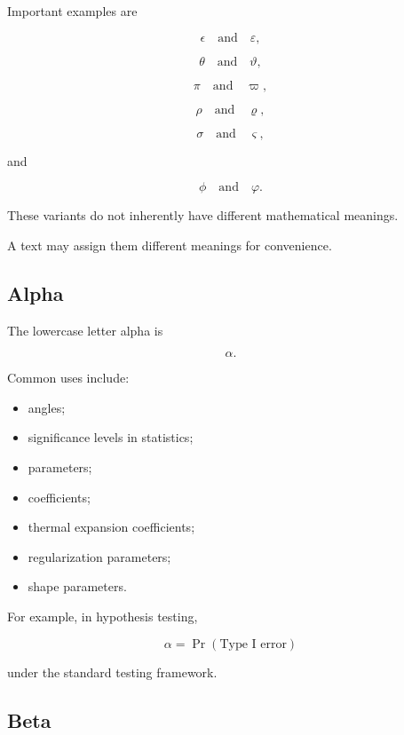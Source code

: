 Important examples are

\[
\boxed{
\epsilon
\quad\text{and}\quad
\varepsilon,
}
\]

\[
\boxed{
\theta
\quad\text{and}\quad
\vartheta,
}
\]

\[
\boxed{
\pi
\quad\text{and}\quad
\varpi,
}
\]

\[
\boxed{
\rho
\quad\text{and}\quad
\varrho,
}
\]

\[
\boxed{
\sigma
\quad\text{and}\quad
\varsigma,
}
\]

and

\[
\boxed{
\phi
\quad\text{and}\quad
\varphi.
}
\]

These variants do not inherently have different mathematical meanings.

A text may assign them different meanings for convenience.

\subsection{Alpha}
\label{subsec:greek-alpha}

The lowercase letter alpha is

\[
\boxed{
\alpha.
}
\]

Common uses include:

\begin{itemize}
    \item angles;
    \item significance levels in statistics;
    \item parameters;
    \item coefficients;
    \item thermal expansion coefficients;
    \item regularization parameters;
    \item shape parameters.
\end{itemize}

For example, in hypothesis testing,

\[
\boxed{
\alpha
=
\Pr(\text{Type I error})
}
\]

under the standard testing framework.

\subsection{Beta}
\label{subsec:greek-beta}

